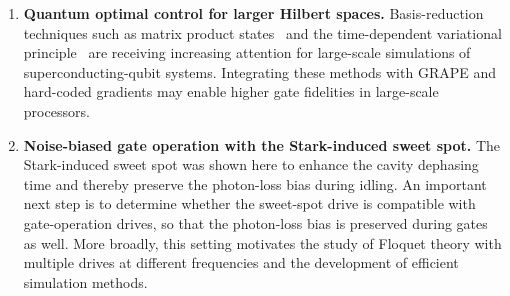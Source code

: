 \begin{enumerate}
    \item \textbf{Quantum optimal control for larger Hilbert spaces.}
    Basis-reduction techniques such as matrix product states~\cite{schollwoeck2011mps} and the time-dependent variational principle~\cite{kramer1981geometrytdvp} are receiving increasing attention for large-scale simulations of superconducting-qubit systems. Integrating these methods with GRAPE and hard-coded gradients may enable higher gate fidelities in large-scale processors.

    \item \textbf{Noise-biased gate operation with the Stark-induced sweet spot.}
    The Stark-induced sweet spot was shown here to enhance the cavity dephasing time and thereby preserve the photon-loss bias during idling. An important next step is to determine whether the sweet-spot drive is compatible with gate-operation drives, so that the photon-loss bias is preserved during gates as well. More broadly, this setting motivates the study of Floquet theory with multiple drives at different frequencies and the development of efficient simulation methods.
\end{enumerate}



